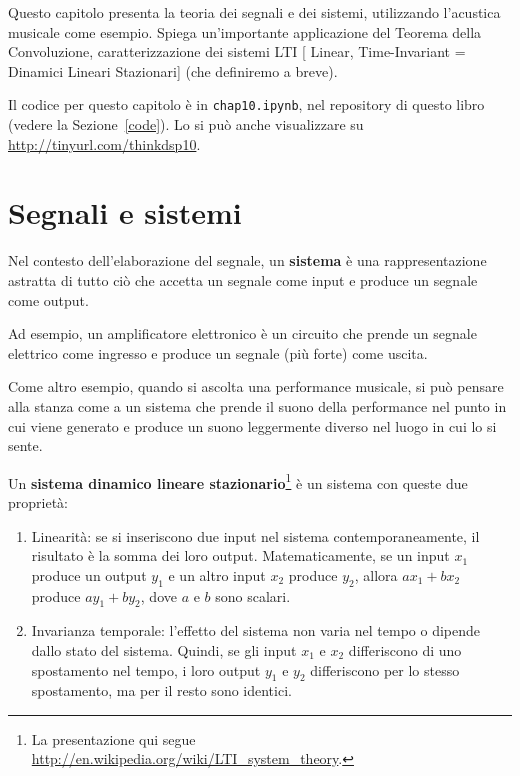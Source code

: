 \documentclass[12pt,a4paper]{book}
\begin{document}
Questo capitolo presenta la teoria dei segnali e dei sistemi, utilizzando l'acustica musicale come esempio. Spiega un'importante applicazione del Teorema della Convoluzione, caratterizzazione dei sistemi LTI [ Linear, Time-Invariant = Dinamici Lineari Stazionari] (che definiremo a breve).

Il codice per questo capitolo è in {\tt chap10.ipynb}, nel repository di questo libro (vedere la Sezione~\ref{code}). Lo si può anche visualizzare su \url{http://tinyurl.com/thinkdsp10}.

\section{Segnali e sistemi} 

Nel contesto dell'elaborazione del segnale, un {\bf sistema} è una rappresentazione astratta di tutto ciò che accetta un segnale come input e produce un segnale come output.

Ad esempio, un amplificatore elettronico è un circuito che prende un segnale elettrico come ingresso e produce un segnale (più forte) come uscita.

Come altro esempio, quando si ascolta una performance musicale, si può pensare alla stanza come a un sistema che prende il suono della performance nel punto in cui viene generato e produce un suono leggermente diverso nel luogo in cui lo si sente.

Un {\bf sistema dinamico lineare stazionario}\footnote{La presentazione qui segue \url{http://en.wikipedia.org/wiki/LTI_system_theory}.} è un sistema con queste due proprietà:

\begin{enumerate} 

\item Linearità: se si inseriscono due input nel sistema contemporaneamente, il risultato è la somma dei loro output. Matematicamente, se un input $x_1$ produce un output $y_1$ e un altro input $x_2$ produce $y_2$, allora $a x_1 + b x_2$ produce $a y_1 + b y_2$, dove $a$ e $b$ sono scalari.

\item Invarianza temporale: l'effetto del sistema non varia nel tempo o dipende dallo stato del sistema. Quindi, se gli input $x_1$ e $x_2$ differiscono di uno spostamento nel tempo, i loro output $y_1$ e $y_2$ differiscono per lo stesso spostamento, ma per il resto sono identici.

\end{enumerate} 
\end{document}
